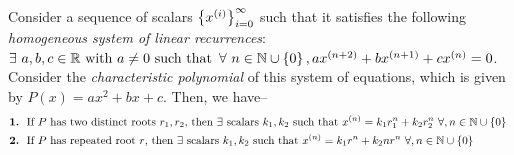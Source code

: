 \documentclass{article}
\begin{document}
\begin{thm}
\label{linearRec}
Consider a sequence of scalars $\left\{{x}^{(i)}\right\}_{i = 0}^\infty$ such that it satisfies the following \emph{homogeneous system of linear recurrences}: $\exists\,a, b, c\in\mathbb{R}\ \text{with}\ a\ne 0\ \text{such that}\ \forall\, n\in\mathbb{N}\cup \left\{0\right\}, a\evx^{(n+2)} + b\evx^{(n+1)} + c\evx^{(n)} = 0$.
Consider the \emph{characteristic polynomial} of this system of equations, which is given by $P\left(x\right) = ax^2 + bx + c$. 
Then, we have--
\begin{align*}
    &
    \text{\textbf{1.}}\ 
    \text{
        If $P$ has two distinct roots $r_1, r_2$, then $\exists$ scalars $k_1, k_2$ such that $\evx^{(n)} = k_1 r_1^n
        +
        k_2 r_2^n
        \, \forall,n\in\mathbb{N}\cup\left\{0\right\}$
    }
    \nonumber\\
    &
    \text{\textbf{2.}}\ 
    \text{
        If $P$ has repeated root $r$, then $\exists$ scalars $k_1, k_2$ such that $\evx^{(n)} = k_1 r^n
        +
        k_2 n r^n
        \, \forall,n\in\mathbb{N}\cup\left\{0\right\}$
    }
\end{align*}
\end{thm}
\end{document}
